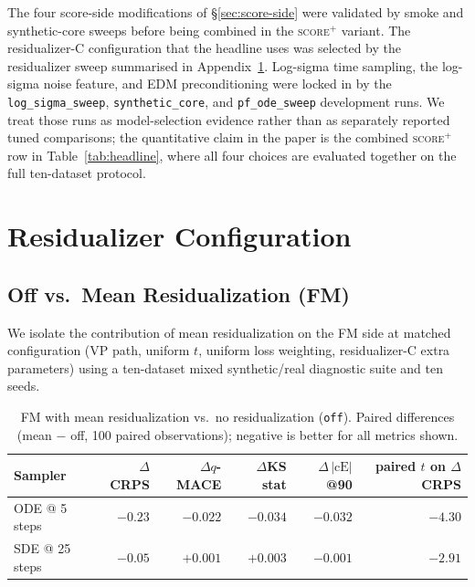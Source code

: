 \documentclass{tpm2026}
\begin{document}
The four score-side modifications of \S\ref{sec:score-side} were validated by smoke and synthetic-core sweeps before being combined in the \textsc{score$^+$} variant.
The residualizer-C configuration that the headline uses was selected by the residualizer sweep summarised in Appendix~\ref{app:resid-config}. Log-sigma time sampling, the log-sigma noise feature, and EDM preconditioning were locked in by the \texttt{log\_sigma\_sweep}, \texttt{synthetic\_core}, and \texttt{pf\_ode\_sweep} development runs. We treat those runs as model-selection evidence rather than as separately reported tuned comparisons; the quantitative claim in the paper is the combined \textsc{score$^+$} row in Table~\ref{tab:headline}, where all four choices are evaluated together on the full ten-dataset protocol.

\section{Residualizer Configuration}\label{app:resid-config}

\subsection{Off vs.\ Mean Residualization (FM)}\label{app:off-vs-mean}

We isolate the contribution of mean residualization on the FM side at matched configuration (VP path, uniform $t$, uniform loss weighting, residualizer-C extra parameters) using a ten-dataset mixed synthetic/real diagnostic suite and ten seeds.

\begin{table}[!h]
  \centering
  \caption{FM with mean residualization vs.\ no residualization (\texttt{off}). Paired differences (mean $-$ off, 100 paired observations); negative is better for all metrics shown.}\label{tab:off-vs-mean}
  \footnotesize
  \begin{tabular}{lrrrrr}
    \toprule
    Sampler & $\Delta$CRPS & $\Delta q$-MACE & $\Delta$KS stat & $\Delta\,|\text{cE}|$@90 & paired $t$ on $\Delta$CRPS \\
    \midrule
    ODE @ 5 steps  & $-0.23$ & $-0.022$ & $-0.034$ & $-0.032$ & $-4.30$ \\
    SDE @ 25 steps & $-0.05$ & $+0.001$ & $+0.003$ & $-0.001$ & $-2.91$ \\
    \bottomrule
  \end{tabular}
\end{table}
\end{document}
